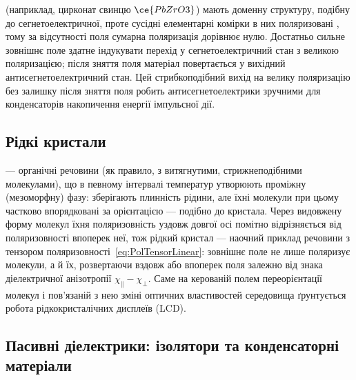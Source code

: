  (наприклад, цирконат свинцю $\ce{PbZrO3}$) мають доменну структуру, подібну до сегнетоелектричної, проте сусідні
елементарні комірки в них поляризовані , тому за відсутності поля сумарна поляризація дорівнює нулю. Достатньо сильне
зовнішнє поле здатне індукувати перехід у сегнетоелектричний стан з великою поляризацією; після зняття поля матеріал повертається у вихідний
антисегнетоелектричний стан. Цей стрибкоподібний вихід на велику поляризацію без залишку після зняття поля робить антисегнетоелектрики зручними
для конденсаторів накопичення енергії імпульсної дії.

\subsection*{Рідкі кристали}\label{sec:LiquidCrystals}

 --- органічні речовини (як правило, з витягнутими, стрижнеподібними молекулами), що в певному інтервалі температур
утворюють проміжну (мезоморфну) фазу: зберігають плинність рідини, але їхні молекули при цьому частково впорядковані за орієнтацією --- подібно до
кристала. Через видовжену форму молекул їхня поляризовність уздовж довгої осі помітно відрізняється від поляризовності впоперек неї, тож рідкий
кристал --- наочний приклад речовини з  тензором поляризовності~\eqref{eq:PolTensorLinear}: зовнішнє поле не лише поляризує
молекули, а й  їх, розвертаючи вздовж або впоперек поля залежно від знака діелектричної анізотропії $\chi_\parallel -
\chi_\perp$. Саме на керованій полем переорієнтації молекул і пов'язаній з нею зміні оптичних властивостей середовища ґрунтується робота
рідкокристалічних дисплеїв (LCD).

\subsection*{Пасивні діелектрики: ізолятори та конденсаторні матеріали}

